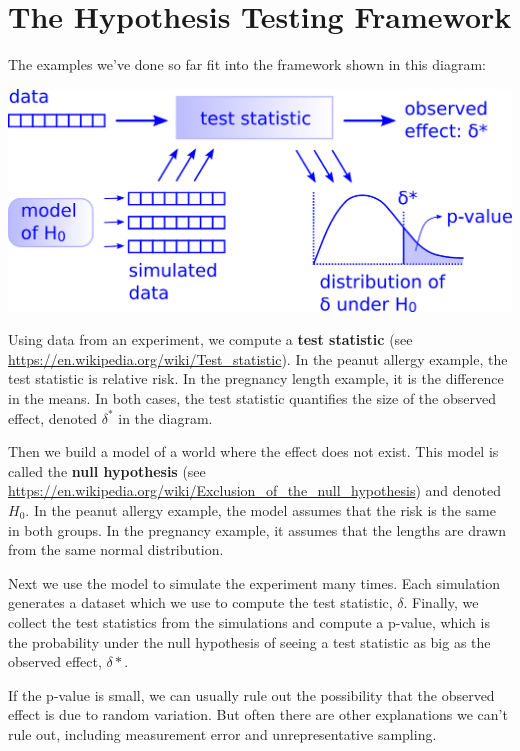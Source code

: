 \hypertarget{the-hypothesis-testing-framework}{%
\section{The Hypothesis Testing
Framework}\label{the-hypothesis-testing-framework}}

The examples we've done so far fit into the framework shown in this
diagram:

\includegraphics{figs/hypothesis_testing.png}

Using data from an experiment, we compute a \textbf{test statistic} (see
\url{https://en.wikipedia.org/wiki/Test_statistic}). In the peanut
allergy example, the test statistic is relative risk. In the pregnancy
length example, it is the difference in the means. In both cases, the
test statistic quantifies the size of the observed effect, denoted
\(\delta^*\) in the diagram.

Then we build a model of a world where the effect does not exist. This
model is called the \textbf{null hypothesis} (see
\url{https://en.wikipedia.org/wiki/Exclusion_of_the_null_hypothesis})
and denoted \(H_0\). In the peanut allergy example, the model assumes
that the risk is the same in both groups. In the pregnancy example, it
assumes that the lengths are drawn from the same normal distribution.

Next we use the model to simulate the experiment many times. Each
simulation generates a dataset which we use to compute the test
statistic, \(\delta\). Finally, we collect the test statistics from the
simulations and compute a p-value, which is the probability under the
null hypothesis of seeing a test statistic as big as the observed
effect, \(\delta*\).

If the p-value is small, we can usually rule out the possibility that
the observed effect is due to random variation. But often there are
other explanations we can't rule out, including measurement error and
unrepresentative sampling.

